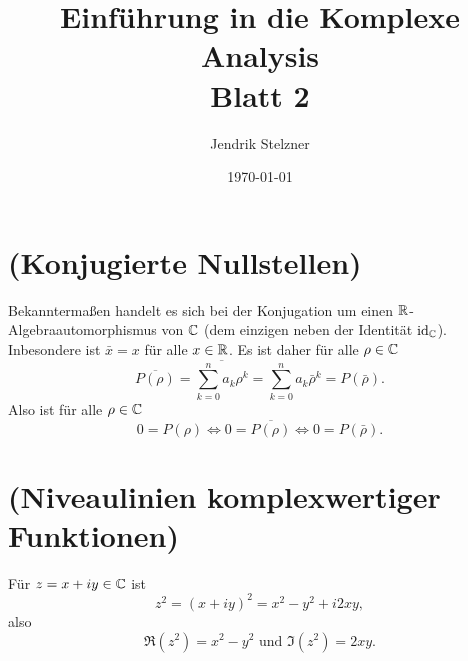 \documentclass[a4paper,10pt]{article}
\title{\sc Einführung in die Komplexe Analysis \\ \Large Blatt 2}
\author{Jendrik Stelzner}
\date{\today}
\begin{document}
\maketitle





\section{(Konjugierte Nullstellen)}
Bekanntermaßen handelt es sich bei der Konjugation um einen $\mathbb{R}$-Algebraauto\-morph\-ismus von $\mathbb{C}$ (dem einzigen neben der Identität $\operatorname{id}_{\mathbb{C}}$). Inbesondere ist $\bar{x} = x$ für alle $x \in \mathbb{R}$. Es ist daher für alle $\rho \in \mathbb{C}$
\[
 \overline{P(\rho)} = \overline{\sum_{k=0}^n a_k \rho^k} = \sum_{k=0}^n a_k \bar{\rho}^k = P(\bar{\rho}).
\]
Also ist für alle $\rho \in \mathbb{C}$
\[
 0 = P(\rho) \Leftrightarrow 0 = \overline{P(\rho)} \Leftrightarrow 0 = P(\bar{\rho}).
\]





\section{(Niveaulinien komplexwertiger Funktionen)}
Für $z = x+iy \in \mathbb{C}$ ist
\[
 z^2 = (x+iy)^2 = x^2 - y^2 + i2xy,
\]
also
\[
 \Re\left(z^2\right) = x^2-y^2 \text{ und } \Im\left(z^2\right) = 2xy.
\]
\end{document}
